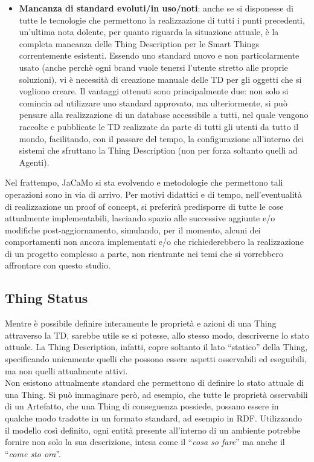 \documentclass[12pt,a4paper,openright,oneside]{report}
\newcommand{\quotes}[1]{``#1''}
\begin{document}
\begin{itemize}
	\item \textbf{Mancanza di standard evoluti/in uso/noti}: anche se si disponesse di tutte le tecnologie che permettono la realizzazione di tutti i punti precedenti, un'ultima nota dolente, per quanto riguarda la situazione attuale, è la completa mancanza delle Thing Description per le Smart Things correntemente esistenti. Essendo uno standard nuovo e non particolarmente usato (anche perchè ogni brand vuole tenersi l'utente stretto alle proprie soluzioni), vi è necessità di creazione manuale delle TD per gli oggetti che si vogliono creare. Il vantaggi ottenuti sono principalmente due: non solo si comincia ad utilizzare uno standard approvato, ma ulteriormente, si può pensare alla realizzazione di un database accessibile a tutti, nel quale vengono raccolte e pubblicate le TD realizzate da parte di tutti gli utenti da tutto il mondo, facilitando, con il passare del tempo, la configurazione all'interno dei sistemi che sfruttano la Thing Description (non per forza soltanto quelli ad Agenti).
\end{itemize}


Nel frattempo, JaCaMo si sta evolvendo e metodologie che permettono tali operazioni sono in via di arrivo. Per motivi didattici e di tempo, nell'eventualità di realizzazione un proof of concept, si preferirà predisporre di tutte le cose attualmente implementabili, lasciando spazio alle successive aggiunte e/o modifiche post-aggiornamento, simulando, per il momento, alcuni dei comportamenti non ancora implementati e/o che richiederebbero la realizzazione di un progetto complesso a parte, non rientrante nei temi che si vorrebbero affrontare con questo studio.

\subsection{Thing Status}
Mentre è possibile definire interamente le proprietà e azioni di una Thing attraverso la TD, sarebbe utile se si potesse, allo stesso modo, descriverne lo stato attuale. La Thing Description, infatti, copre soltanto il lato \quotes{statico} della Thing, specificando unicamente quelli che possono essere aspetti osservabili ed eseguibili, ma non quelli attualmente attivi.\\

Non esistono attualmente standard che permettono di definire lo stato attuale di una Thing. Si può immaginare però, ad esempio, che tutte le proprietà osservabili di un Artefatto, che una Thing di conseguenza possiede, possano essere in qualche modo tradotte in un formato standard, ad esempio in RDF. Utilizzando il modello così definito, ogni entità presente all'interno di un ambiente potrebbe fornire non solo la sua descrizione, intesa come il \quotes{\textit{cosa so fare}} ma anche il \quotes{\textit{come sto ora}}.\\
\end{document}
